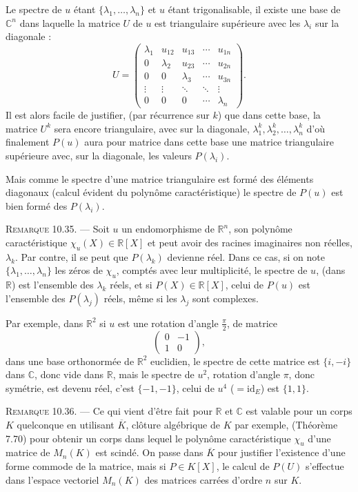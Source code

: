 Le spectre de $u$ étant $\{\lambda_1,\ldots,\lambda_n\}$ et $u$ étant trigonalisable, il existe une base de $\mathbb C^n$ dans laquelle la matrice $U$ de $u$ est triangulaire supérieure avec les $\lambda_i$ sur la diagonale :
\[
U=
\begin{pmatrix}
\lambda_1&u_{12}&u_{13}&\cdots&u_{1n}\\
0&\lambda_2&u_{23}&\cdots&u_{2n}\\
0&0&\lambda_3&\cdots&u_{3n}\\
\vdots&\vdots&\ddots&\ddots&\vdots\\
0&0&0&\cdots&\lambda_n
\end{pmatrix}.
\]
Il est alors facile de justifier, (par récurrence sur $k$) que dans cette base, la matrice $U^k$ sera encore triangulaire, avec sur la diagonale, $\lambda_1^k,\lambda_2^k,\ldots,\lambda_n^k$ d'où finalement $P(u)$ aura pour matrice dans cette base une matrice triangulaire supérieure avec, sur la diagonale, les valeurs $P(\lambda_i)$.

Mais comme le spectre d'une matrice triangulaire est formé des éléments diagonaux (calcul évident du polynôme caractéristique) le spectre de $P(u)$ est bien formé des $P(\lambda_i)$. \bookend

\medskip\noindent\textsc{Remarque 10.35.} --- Soit $u$ un endomorphisme de $\mathbb R^n$, son polynôme caractéristique $\chi_u(X)\in\mathbb R[X]$ et peut avoir des racines imaginaires non réelles, $\lambda_k$. Par contre, il se peut que $P(\lambda_k)$ devienne réel. Dans ce cas, si on note $\{\lambda_1,\ldots,\lambda_n\}$ les zéros de $\chi_u$, comptés avec leur multiplicité, le spectre de $u$, (dans $\mathbb R$) est l'ensemble des $\lambda_k$ réels, et si $P(X)\in\mathbb R[X]$, celui de $P(u)$ est l'ensemble des $P(\lambda_j)$ réels, même si les $\lambda_j$ sont complexes.

Par exemple, dans $\mathbb R^2$ si $u$ est une rotation d'angle $\frac\pi2$, de matrice
\[
\begin{pmatrix}0&-1\\1&0\end{pmatrix},
\]
dans une base orthonormée de $\mathbb R^2$ euclidien, le spectre de cette matrice est $\{i,-i\}$ dans $\mathbb C$, donc vide dans $\mathbb R$, mais le spectre de $u^2$, rotation d'angle $\pi$, donc symétrie, est devenu réel, c'est $\{-1,-1\}$, celui de $u^4$ ($=\mathrm{id}_E$) est $\{1,1\}$.

\medskip\noindent\textsc{Remarque 10.36.} --- Ce qui vient d'être fait pour $\mathbb R$ et $\mathbb C$ est valable pour un corps $K$ quelconque en utilisant $\overline K$, clôture algébrique de $K$ par exemple, (Théorème 7.70) pour obtenir un corps dans lequel le polynôme caractéristique $\chi_u$ d'une matrice de $M_n(K)$ est scindé. On passe dans $\overline K$ pour justifier l'existence d'une forme commode de la matrice, mais si $P\in K[X]$, le calcul de $P(U)$ s'effectue dans l'espace vectoriel $M_n(K)$ des matrices carrées d'ordre $n$ sur $K$.

